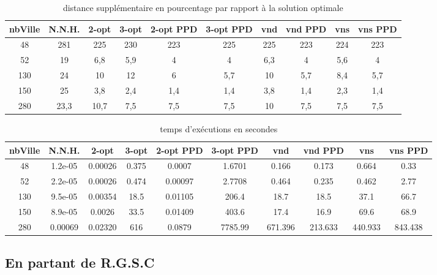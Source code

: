 \documentclass[12pt,a4paper]{article}
\begin{document}
\begin{table}[h]
\centering
\begin{tabular}{|*{10}{c|}}
  \hline
  nbVille & N.N.H. & 2-opt & 3-opt & 2-opt PPD & 3-opt PPD & vnd & vnd PPD & vns & vns PPD \\
  \hline
  48 & 281 & 225 & 230 & 223 & 225 & 225 & 223 & 224 & 223 \\
  52 & 19 & 6,8 & 5,9 & 4 & 4 & 6,3 & 4 & 5,6 & 4 \\
  130 & 24 & 10 & 12 & 6 & 5,7 & 10 & 5,7 & 8,4 & 5,7 \\
  150 & 25 & 3,8 & 2,4 & 1,4 & 1,4 & 3,8 & 1,4 & 2,3 & 1,4 \\
  280 & 23,3 & 10,7 & 7,5 & 7,5 & 7,5 & 10 & 7,5 & 7,5 & 7,5 \\
  \hline
\end{tabular}
\caption{distance supplémentaire en pourcentage par rapport à la solution optimale}
\label{NNHpourcentage}
\end{table}

\begin{table}[h]
\centering
\begin{tabular}{|*{10}{c|}}
  \hline
  nbVille & N.N.H. & 2-opt & 3-opt & 2-opt PPD & 3-opt PPD & vnd & vnd PPD & vns & vns PPD \\
  \hline
  48 & 1.2e-05 & 0.00026 & 0.375 & 0.0007 & 1.6701 & 0.166 & 0.173 & 0.664 & 0.33 \\
  52 & 2.2e-05 & 0.00026 & 0.474 & 0.00097 & 2.7708 & 0.464 & 0.235 & 0.462 & 2.77 \\
  130 & 9.5e-05 & 0.00354 & 18.5 & 0.01105 & 206.4 & 18.7 & 18.5 & 37.1 & 66.7 \\
  150 & 8.9e-05 & 0.0026 & 33.5 & 0.01409 & 403.6 & 17.4 & 16.9 & 69.6 & 68.9 \\
  280 & 0.00069 & 0.02320 & 616 & 0.0879 & 7785.99 & 671.396 & 213.633 & 440.933 & 843.438 \\ 
  \hline
\end{tabular}
\caption{temps d’exécutions en secondes}
\label{NNHpourcentage}
\end{table}

\subsection{En partant de R.G.S.C}
\end{document}
